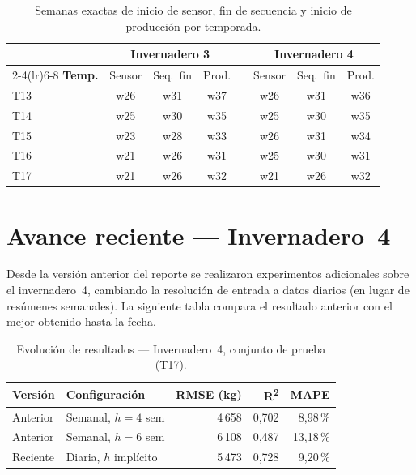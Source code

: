 \documentclass[11pt,a4paper]{article}
\begin{document}
\begin{table}[H]
\centering
\caption{Semanas exactas de inicio de sensor, fin de secuencia y inicio de producción por temporada.}
\label{tab:brechas}
\small
\begin{tabularx}{0.88\linewidth}{@{} l ccc c ccc @{}}
\toprule
 & \multicolumn{3}{c}{\textbf{Invernadero 3}}
 & \phantom{x}
 & \multicolumn{3}{c}{\textbf{Invernadero 4}} \\
\cmidrule(lr){2-4}\cmidrule(lr){6-8}
\textbf{Temp.} & Sensor & Seq.\ fin & Prod. & & Sensor & Seq.\ fin & Prod. \\
\midrule
T13 & w26 & w31 & w37 & & w26 & w31 & w36 \\
T14 & w25 & w30 & w35 & & w25 & w30 & w35 \\
T15 & w23 & w28 & w33 & & w26 & w31 & w34 \\
T16 & w21 & w26 & w31 & & w25 & w30 & w31 \\
T17 & w21 & w26 & w32 & & w21 & w26 & w32 \\
\bottomrule
\end{tabularx}
\end{table}

\section{Avance reciente — Invernadero~4}

Desde la versión anterior del reporte se realizaron experimentos adicionales sobre el invernadero~4, cambiando la resolución de entrada a datos diarios (en lugar de resúmenes semanales). La siguiente tabla compara el resultado anterior con el mejor obtenido hasta la fecha.

\begin{table}[H]
  \centering
  \caption{Evolución de resultados --- Invernadero~4, conjunto de prueba (T17).}
  \label{tab:inv4_progress}
  \small
  \begin{tabularx}{0.88\linewidth}{@{} l l r r r @{}}
    \toprule
    \textbf{Versión} & \textbf{Configuración} & \textbf{RMSE (kg)} & \textbf{R\textsuperscript{2}} & \textbf{MAPE} \\
    \midrule
    Anterior & Semanal, $h=4$ sem    & 4\,658 & 0{,}702 &  8{,}98\,\% \\
    Anterior & Semanal, $h=6$ sem    & 6\,108 & 0{,}487 & 13{,}18\,\% \\
    Reciente & Diaria, $h$ implícito & 5\,473 & 0{,}728 &  9{,}20\,\% \\
    \bottomrule
  \end{tabularx}
\end{table}
\end{document}
